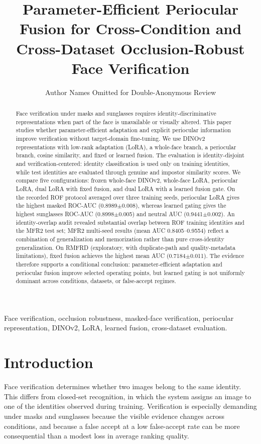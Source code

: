 ﻿\documentclass[10pt,journal,compsoc]{IEEEtran}
\title{Parameter-Efficient Periocular Fusion for Cross-Condition and Cross-Dataset Occlusion-Robust Face Verification}
\author{Author Names Omitted for Double-Anonymous Review}
\begin{document}
\maketitle
\begin{abstract}
Face verification under masks and sunglasses requires identity-discriminative representations when part of the face is unavailable or visually altered. This paper studies whether parameter-efficient adaptation and explicit periocular information improve verification without target-domain fine-tuning. We use DINOv2 representations with low-rank adaptation (LoRA), a whole-face branch, a periocular branch, cosine similarity, and fixed or learned fusion. The evaluation is identity-disjoint and verification-centered: identity classification is used only on training identities, while test identities are evaluated through genuine and impostor similarity scores. We compare five configurations: frozen whole-face DINOv2, whole-face LoRA, periocular LoRA, dual LoRA with fixed fusion, and dual LoRA with a learned fusion gate. On the recorded ROF protocol averaged over three training seeds, periocular LoRA gives the highest masked ROC-AUC (0.8989$\pm$0.008), whereas learned gating gives the highest sunglasses ROC-AUC (0.8998$\pm$0.005) and neutral AUC (0.9441$\pm$0.002). An identity-overlap audit revealed substantial overlap between ROF training identities and the MFR2 test set; MFR2 multi-seed results (mean AUC 0.8405--0.9554) reflect a combination of generalization and memorization rather than pure cross-identity generalization. On RMFRD (exploratory, with duplicate-path and quality-metadata limitations), fixed fusion achieves the highest mean AUC (0.7184$\pm$0.011). The evidence therefore supports a conditional conclusion: parameter-efficient adaptation and periocular fusion improve selected operating points, but learned gating is not uniformly dominant across conditions, datasets, or false-accept regimes.
\end{abstract}
\begin{IEEEkeywords}
Face verification, occlusion robustness, masked-face verification, periocular representation, DINOv2, LoRA, learned fusion, cross-dataset evaluation.
\end{IEEEkeywords}

\section{Introduction}
Face verification determines whether two images belong to the same identity. This differs from closed-set recognition, in which the system assigns an image to one of the identities observed during training. Verification is especially demanding under masks and sunglasses because the visible evidence changes across conditions, and because a false accept at a low false-accept rate can be more consequential than a modest loss in average ranking quality.
\end{document}
